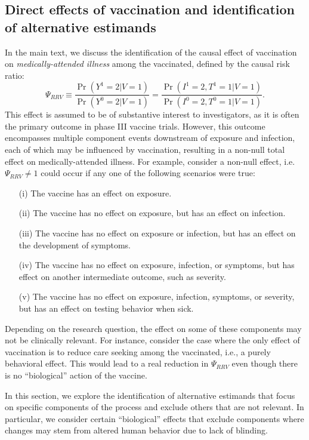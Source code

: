\begin{appendix}
\begin{refsection}
\newpage

    \section{Direct effects of vaccination and identification of alternative estimands}\label{sec:de_testing}
    In the main text, we discuss the identification of the causal effect of vaccination on \textit{medically-attended illness} among the vaccinated, defined by the causal risk ratio:
    \[\Psi_{RRV} \equiv \dfrac{\Pr(Y^1 = 2| V = 1)}{\Pr(Y^0 = 2 | V = 1)} = \dfrac{\Pr(I^1 = 2, T^1 =1 | V = 1)}{\Pr(I^0 = 2, T^0 =1 | V = 1)}.\]
    This effect is assumed to be of substantive interest to investigators, as it is often the primary outcome in phase III vaccine trials. However, this outcome encompasses multiple component events downstream of exposure and infection, each of which may be influenced by vaccination, resulting in a non-null total effect on medically-attended illness. For example, consider a non-null effect, i.e. $\Psi_{RRV} \neq 1$ could occur if any one of the following scenarios were true:
    \begin{itemize}
        \item[(i)] The vaccine has an effect on exposure.
        \item[(ii)] The vaccine has no effect on exposure, but has an effect on infection.
        \item[(iii)] The vaccine has no effect on exposure or infection, but has an effect on the development of symptoms.
        \item[(iv)] The vaccine has no effect on exposure, infection, or symptoms, but has effect on another intermediate outcome, such as severity.
        \item[(v)] The vaccine has no effect on exposure, infection, symptoms, or severity, but has an effect on testing behavior when sick.
    \end{itemize}
    Depending on the research question, the effect on some of these components may not be clinically relevant. For instance, consider the case where the only effect of vaccination is to reduce care seeking among the vaccinated, i.e., a purely behavioral effect. This would lead to a real reduction in $\Psi_{RRV}$ even though there is no ``biological'' action of the vaccine.
    
    In this section, we explore the identification of alternative estimands that focus on specific components of the process and exclude others that are not relevant. In particular, we consider certain ``biological'' effects that exclude components where changes may stem from altered human behavior due to lack of blinding. 


\end{refsection}
\end{appendix}
